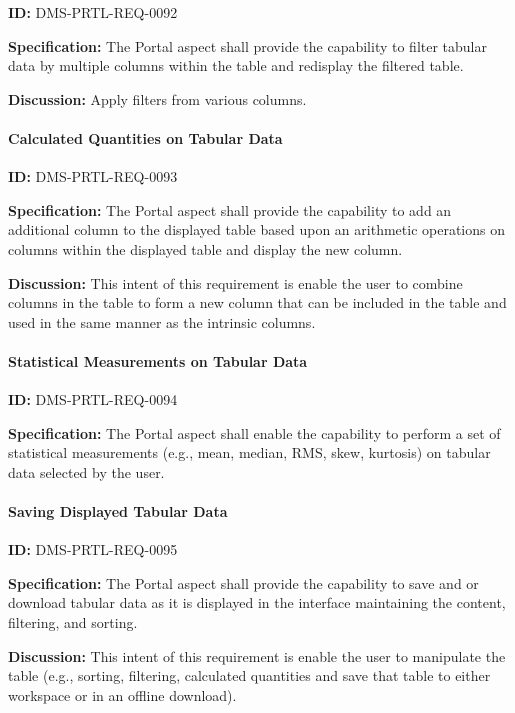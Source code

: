 \documentclass[SE,toc]{lsstdoc}
\begin{document}
\label{DMS-PRTL-REQ-0092}
\textbf{ID:} DMS-PRTL-REQ-0092

\textbf{Specification:}
The Portal aspect shall provide the capability to filter tabular data by multiple columns within the table and redisplay the filtered table.

\textbf{Discussion:}
Apply filters from various columns.

\paragraph{Calculated Quantities on Tabular Data}\hfill  %

\label{DMS-PRTL-REQ-0093}
\textbf{ID:} DMS-PRTL-REQ-0093

\textbf{Specification:}
The Portal aspect shall provide the capability to add an additional column to the displayed table based upon an arithmetic operations on columns within the displayed table and display the new column.

\textbf{Discussion:}
This intent of this requirement is enable the user to combine columns in the table to form a new column that can be included in the table and used in the same manner as the intrinsic columns.

\paragraph{Statistical Measurements on Tabular Data}\hfill  %

\label{DMS-PRTL-REQ-0094}
\textbf{ID:} DMS-PRTL-REQ-0094

\textbf{Specification:}
The Portal aspect shall enable the capability to perform a set of statistical measurements (e.g., mean, median, RMS, skew, kurtosis) on tabular data selected by the user.

\paragraph{Saving Displayed Tabular Data}\hfill  %

\label{DMS-PRTL-REQ-0095}
\textbf{ID:} DMS-PRTL-REQ-0095

\textbf{Specification:}
The Portal aspect shall provide the capability to save and or download tabular data as it is displayed in the interface maintaining the content, filtering, and sorting.

\textbf{Discussion:}
This intent of this requirement is enable the user to manipulate the table (e.g., sorting, filtering, calculated quantities and save that table to either workspace or in an offline download).
\end{document}
